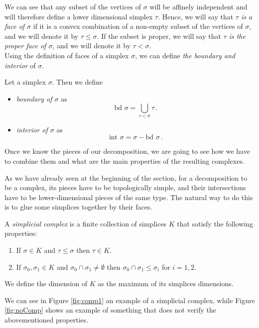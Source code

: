 \documentclass[../main.tex]{subfiles}
\begin{document}
We can see that any subset of the vertices of $\sigma$ will be affinely independent and will therefore define a lower dimensional simplex $\tau$. Hence, we will say that \emph{$\tau$ is a face of $\sigma$} if it is a convex combination of a non-empty subset of the vertices of $\sigma$, and we will denote it by $\tau \leq \sigma$. If the subset is proper, we will say that \emph{$\tau$ is the proper face of $\sigma$}, and we will denote it by $\tau < \sigma$.\\

Using the definition of faces of a simplex $\sigma$, we can define \emph{the boundary and interior} of $\sigma$.

\begin{definition}
Let a simplex $\sigma$. Then we define
\begin{itemize}
	\item \emph{boundary of $\sigma$} as \[\text{bd } \sigma = \bigcup_{\tau<\sigma}\tau\,.\]
	\item \emph{interior of $\sigma$} as \[\text{int }\sigma= \sigma - \text{bd }\sigma\,.\]
\end{itemize}
\end{definition}

Once we know the pieces of our decomposition, we are going to see how we have to combine them and what are the main properties of the resulting complexes.

As we have already seen at the beginning of the section, for a decomposition to be a complex, its pieces have to be topologically simple, and their intersections have to be lower-dimensional pieces of the same type. The natural way to do this is to glue some simplices together by their faces.

\begin{definition}
A \emph{simplicial complex} is a finite collection of simplices $K$ that satisfy the following properties:
\begin{enumerate}
	\item If $\sigma \in K$ and $\tau \leq \sigma$ then $\tau \in K$.
	\item If $\sigma_0,\sigma_1 \in K$ and $\sigma_0 \cap \sigma_1 \neq \emptyset$ then $\sigma_0 \cap \sigma_1 \leq \sigma_i$ for $i = 1,2$.
\end{enumerate}
\end{definition}

We define the dimension of $K$ as the maximum of its simplices dimensions.

We can see in Figure \ref{fig:comp1} an example of a simplicial complex, while Figure \ref{fig:noComp} shows an example of something that does not verify the abovementioned properties.
\end{document}

